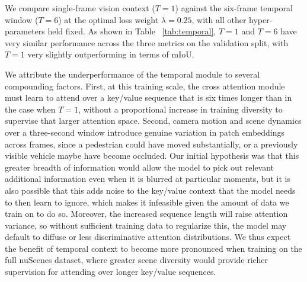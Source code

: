 \documentclass[10pt,twocolumn,letterpaper]{article}
\begin{document}
We compare single-frame vision context ($T=1$) against the six-frame temporal window ($T=6$) at the optimal loss weight $\lambda = 0.25$, with all other hyper-parameters held fixed. As shown in Table ~\ref{tab:temporal}, $T=1$ and $T=6$ have very similar performance across the three metrics on the validation split, with $T=1$ very slightly outperforming in terms of mIoU.

We attribute the underperformance of the temporal module to several compounding factors. First, at this training scale, the cross attention module must learn to attend over a key/value sequence that is six times longer than in the case when $T=1$, without a proportional increase in training diversity to supervise that larger attention space. Second, camera motion and scene dynamics over a three-second window introduce genuine variation in patch embeddings across frames, since a pedestrian could have moved substantially, or a previously visible vehicle maybe have become occluded. Our initial hypothesis was that this greater breadth of information would allow the model to pick out relevant additional information even when it is blurred at particular moments, but it is also possible that this adds noise to the key/value context that the model needs to then learn to ignore, which makes it infeasible given the amount of data we train on to do so. Moreover, the increased sequence length will raise attention variance, so without sufficient training data to regularize this, the model may default to diffuse or less discriminative attention distributions. We thus expect the benefit of temporal context to become more pronounced when training on the full nuScenes dataset, where greater scene diversity would provide richer supervision for attending over longer key/value sequences. 
\end{document}
